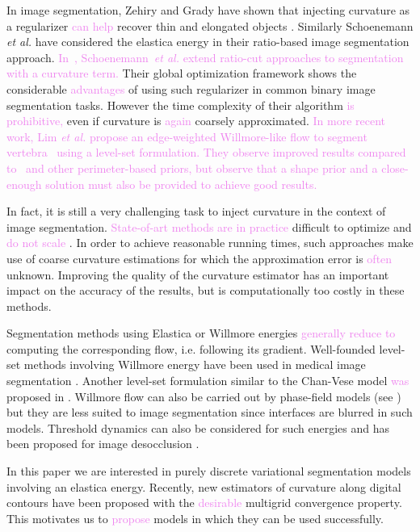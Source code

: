 \documentclass[runningheads]{llncs}
\newcommand{\HT}[1]{{\textcolor{violet}{#1}}}
\begin{document}
In image segmentation, Zehiry and Grady have shown that injecting curvature as a regularizer \HT{can help} recover thin
and elongated objects \cite{zehiry10fast}. Similarly Schoenemann {\em et al.}  \cite{schoenemann09linear} have
considered the elastica energy in their ratio-based image segmentation approach. \HT{ In~\cite{schoenemann2011elastic},
Schoenemann~{\em et al.} extend ratio-cut approaches to segmentation with a curvature term.} Their global optimization
framework shows the considerable \HT{advantages} of using such regularizer in common binary image segmentation tasks.
However the time complexity of their algorithm \HT{is prohibitive,} even if curvature is \HT{again} coarsely
approximated.  \HT{In more recent work, Lim {\em et al.} propose an edge-weighted Willmore-like flow to segment
vertebra~\cite{lim2012introducing} using a level-set formulation.  They observe improved results compared
to~\cite{casseles97geodesic} and other perimeter-based priors, but observe that a shape prior and a close-enough
solution must also be provided to achieve good results.}

In fact, it is still a very challenging task to inject curvature in
the context of image segmentation.  
\HT{State-of-art methods are in practice} difficult to optimize and \HT{do not scale}
\cite{zehiry10fast,schoenemann09linear,strandmark11globalframework,nieuwenhuis14efficient}. In
order to achieve reasonable running times, such approaches make use of
coarse curvature estimations for which the approximation error is
\HT{often} unknown. Improving the quality of the curvature estimator has an
important impact on the accuracy of the results, but is
computationally too costly in these methods.

Segmentation methods using Elastica or Willmore energies \HT{generally
reduce to} computing the corresponding flow, i.e. following its
gradient. Well-founded level-set methods involving Willmore energy
\cite{droske2004level} have been used in medical image segmentation
\cite{lim2012introducing}. Another level-set formulation similar to
the Chan-Vese model \HT{was} proposed in \cite{zhu2013image}. Willmore
flow can also be carried out by phase-field models (see
\cite{bretin2015phase}) but they are less suited to image segmentation
since interfaces are blurred in such models. Threshold dynamics can
also be considered for such energies \cite{esedoglu2008threshold} and
has been proposed for image desocclusion \cite{esedoglu2005threshold}.

In this paper we are interested in purely discrete variational segmentation models involving an elastica
energy. Recently, new estimators of curvature along digital contours have been proposed
\cite{roussillon11mdca,coeurjolly13integral,schindele17mdca} with the \HT{desirable} multigrid convergence property. This
motivates us to \HT{propose} models in which they can be used successfully.
\end{document}
